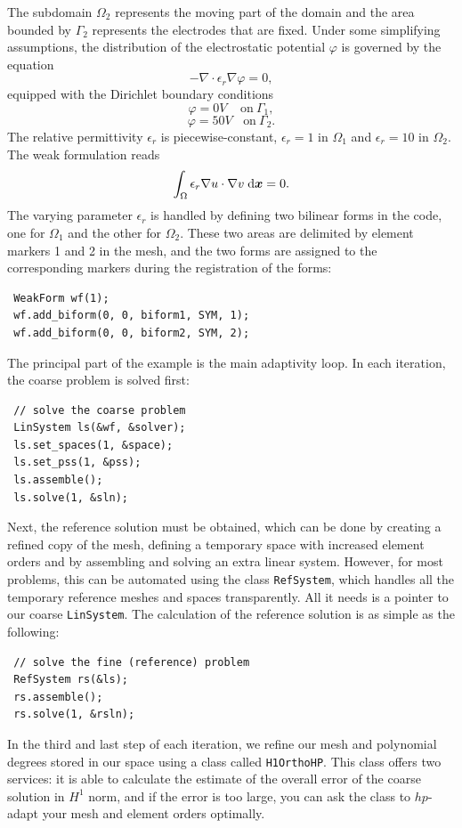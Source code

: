 The subdomain $\Omega_2$ represents the moving part of the domain and the area bounded by $\Gamma_2$
represents the electrodes that are fixed. Under some simplifying assumptions, the distribution
of the electrostatic potential $\varphi$ is governed by the equation
$$-\nabla\cdot\epsilon_r\nabla\varphi = 0,$$
equipped with the Dirichlet boundary conditions
$$\varphi = 0 V \ \ \ \ \ \mbox{on}\ \Gamma_1,$$
$$\varphi = 50 V \ \ \ \ \mbox{on}\ \Gamma_2.$$
The relative permittivity $\epsilon_r$ is piecewise-constant, $\epsilon_r = 1$ in $\Omega_1$ and
$\epsilon_r = 10$ in $\Omega_2$. The weak formulation reads
$$\int_\Omega \epsilon_r \nabla u \cdot \nabla v \;\mbox{d}\mbox{\boldmath $x$} = 0.$$
The varying parameter $\epsilon_r$ is handled by defining two bilinear forms in the code, one for
$\Omega_1$ and the other for $\Omega_2$. These two areas are delimited by element markers 1 and 2 in
the mesh, and the two forms are assigned to the corresponding markers during the registration of
the forms:
\begin{lstlisting}
 WeakForm wf(1);
 wf.add_biform(0, 0, biform1, SYM, 1);
 wf.add_biform(0, 0, biform2, SYM, 2);
\end{lstlisting}

The principal part of the example is the main adaptivity loop. In each iteration, the coarse problem
is solved first:
\begin{lstlisting}
 // solve the coarse problem
 LinSystem ls(&wf, &solver);
 ls.set_spaces(1, &space);
 ls.set_pss(1, &pss);
 ls.assemble();
 ls.solve(1, &sln);
\end{lstlisting}

Next, the reference solution must be obtained, which can be done by creating a refined copy of the mesh,
defining a temporary space with increased element orders and by assembling and solving an extra
linear system. However, for most problems, this can be automated using the class {\tt RefSystem}, which
handles all the temporary reference meshes and spaces transparently. All it needs is a pointer to our coarse
{\tt LinSystem}. The calculation of the reference solution is as simple as the following:
\begin{lstlisting}
 // solve the fine (reference) problem
 RefSystem rs(&ls);
 rs.assemble();
 rs.solve(1, &rsln);
\end{lstlisting}

In the third and last step of each iteration, we refine our mesh and polynomial degrees stored
in our space using a class called {\tt H1OrthoHP}. This class offers two services: it is able to
calculate  the estimate of the overall error of the coarse solution in $H^1$ norm, and if the
error is too large, you can ask the class to $hp$-adapt your mesh and element orders optimally.

